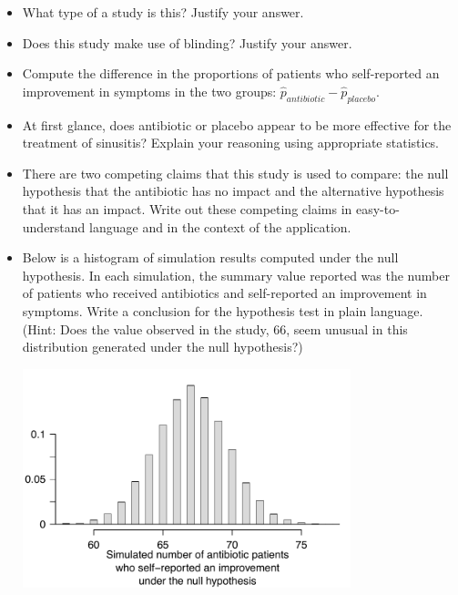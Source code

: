 \begin{itemize}


\item What type of a study is this? Justify your answer.


\item Does this study make use of blinding? Justify your answer.


\item Compute the difference in the proportions of patients who self-reported an improvement in symptoms in the two groups: $\hat{p}_{antibiotic} - \hat{p}_{placebo}$.


\item At first glance, does antibiotic or placebo appear to be more effective for the treatment of sinusitis? Explain your reasoning using appropriate statistics.


\item There are two competing claims that this study is used to compare: the null hypothesis that the antibiotic has no impact and the alternative hypothesis that it has an impact. Write out these competing claims in easy-to-understand language and in the context of the application.


\item Below is a histogram of simulation results computed under the null hypothesis. In each simulation, the summary value reported was the number of patients who received antibiotics and self-reported an improvement in symptoms. Write a conclusion for the hypothesis test in plain language. (Hint: Does the value observed in the study, 66, seem unusual in this distribution generated under the null hypothesis?)


\begin{center}


\includegraphics[width = 0.75\textwidth]{includes/sinusitis}


\end{center}


\end{itemize}

















